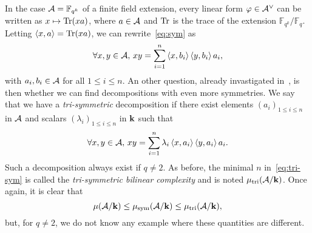 \documentclass[a4paper,11pt]{article}
\begin{document}
In the case $\mathcal{A}=\mathbb{F}_{q^k}$ of a finite field extension, every linear form
$\varphi\in\mathcal{A}^\vee$ can be written as $x\mapsto\operatorname{Tr}(x a)$, where
$a\in\mathcal{A}$ and $\operatorname{Tr}$ is the trace of the extension
$\mathbb{F}_{q^k}/\mathbb{F}_q$. Letting $\left\langle x,a\right\rangle=\operatorname{Tr}(xa)$, we can
rewrite~\eqref{eq:sym} as
\begin{equation}
  \forall x, y\in\mathcal{A},\,xy = \sum_{i=1}^{n}\left\langle x,b_i\right\rangle\left\langle y,b_i\right\rangle a_i,
  \label{eq:sym-tr}
\end{equation}
with $a_i, b_i\in\mathcal{A}$ for all $1\leq i\leq n$. An other question,
already invastigated in~\cite{SL84}, is then
whether we can find decompositions with even more symmetries. We say that we
have a \emph{tri-symmetric} decomposition if there exist elements $(a_i)_{1\leq i
\leq n}$ in $\mathcal{A}$ and scalars $(\lambda_i)_{1\leq i \leq n}$ in $\mathbf{k}$ such that
\begin{equation}
  \forall x, y\in\mathcal{A},\,xy =
  \sum_{i=1}^{n}\lambda_i\left\langle x,a_i\right\rangle\left\langle y,a_i\right\rangle a_i.
  \label{eq:tri-sym}
\end{equation}
Such a decomposition always exist if $q\neq2$. As before, the minimal $n$
in~\eqref{eq:tri-sym} is called the \emph{tri-symmetric bilinear complexity} and
is noted $\mu_{\text{tri}}(\mathcal{A}/\mathbf{k})$. Once again, it is clear that
\[
  \mu(\mathcal{A}/\mathbf{k}) \leq \mu_{\text{sym}}(\mathcal{A}/\mathbf{k})\leq\mu_{\text{tri}}(\mathcal{A}/\mathbf{k}),
\]
but, for $q\neq2$, we do not know any example where these quantities are
different.
\end{document}
